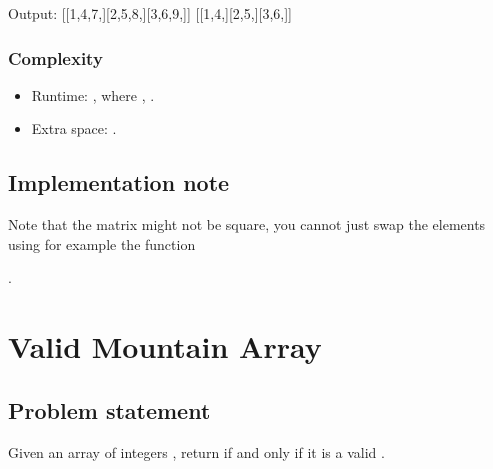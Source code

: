 \documentclass[letterpaper,12pt,english]{book}
\begin{document}
\begin{sphinxVerbatim}[commandchars=\\\{\}]
Output:
[[1,4,7,][2,5,8,][3,6,9,]]
[[1,4,][2,5,][3,6,]]
\end{sphinxVerbatim}


\subsubsection{Complexity}
\label{\detokenize{Array/01_ARR_867_Transpose_Matrix:complexity}}\begin{itemize}
\item {} 
\sphinxAtStartPar
Runtime: , where , .

\item {} 
\sphinxAtStartPar
Extra space: .

\end{itemize}


\subsection{Implementation note}
\label{\detokenize{Array/01_ARR_867_Transpose_Matrix:implementation-note}}
\sphinxAtStartPar
Note that the matrix might not be square, you cannot just swap the elements using for example the function %
\begin{footnote}[16]\sphinxAtStartFootnote
{}
%
\end{footnote}.

\sphinxstepscope


\section{Valid Mountain Array}
\label{\detokenize{Array/01_ARR_941_Valid_Mountain_Array:valid-mountain-array}}\label{\detokenize{Array/01_ARR_941_Valid_Mountain_Array::doc}}

\subsection{Problem statement\sphinxfootnotemark[17]}
\label{\detokenize{Array/01_ARR_941_Valid_Mountain_Array:problem-statement}}%
\begin{footnotetext}[17]\sphinxAtStartFootnote
{}
%
\end{footnotetext}\ignorespaces 
\sphinxAtStartPar
Given an array of integers , return  if and only if it is a valid .
\end{document}
